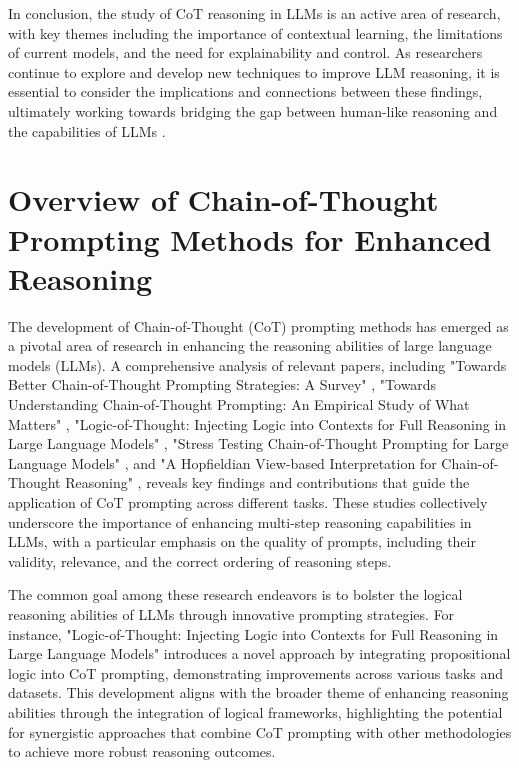 \documentclass[conference]{IEEEtran}
\begin{document}
In conclusion, the study of CoT reasoning in LLMs is an active area of research, with key themes including the importance of contextual learning, the limitations of current models, and the need for explainability and control. As researchers continue to explore and develop new techniques to improve LLM reasoning, it is essential to consider the implications and connections between these findings, ultimately working towards bridging the gap between human-like reasoning and the capabilities of LLMs \cite{b17}.

\section{Overview of Chain-of-Thought Prompting Methods for Enhanced Reasoning}
The development of Chain-of-Thought (CoT) prompting methods has emerged as a pivotal area of research in enhancing the reasoning abilities of large language models (LLMs). A comprehensive analysis of relevant papers, including "Towards Better Chain-of-Thought Prompting Strategies: A Survey" \cite{b1}, "Towards Understanding Chain-of-Thought Prompting: An Empirical Study of What Matters" \cite{b2}, "Logic-of-Thought: Injecting Logic into Contexts for Full Reasoning in Large Language Models" \cite{b3}, "Stress Testing Chain-of-Thought Prompting for Large Language Models" \cite{b4}, and "A Hopfieldian View-based Interpretation for Chain-of-Thought Reasoning" \cite{b5}, reveals key findings and contributions that guide the application of CoT prompting across different tasks. These studies collectively underscore the importance of enhancing multi-step reasoning capabilities in LLMs, with a particular emphasis on the quality of prompts, including their validity, relevance, and the correct ordering of reasoning steps.

The common goal among these research endeavors is to bolster the logical reasoning abilities of LLMs through innovative prompting strategies. For instance, "Logic-of-Thought: Injecting Logic into Contexts for Full Reasoning in Large Language Models" \cite{b3} introduces a novel approach by integrating propositional logic into CoT prompting, demonstrating improvements across various tasks and datasets. This development aligns with the broader theme of enhancing reasoning abilities through the integration of logical frameworks, highlighting the potential for synergistic approaches that combine CoT prompting with other methodologies to achieve more robust reasoning outcomes.
\end{document}

